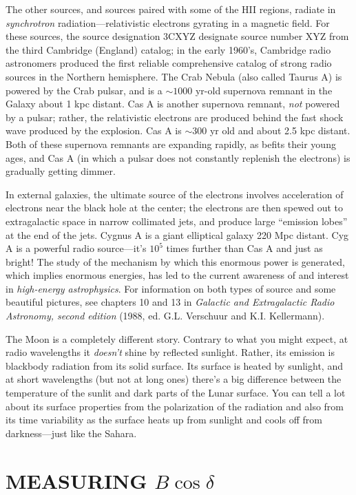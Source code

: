 \documentclass[11pt,preprint]{aastex}
\begin{document}
The other sources, and sources paired with some of the HII regions,
radiate in {\it synchrotron} radiation---relativistic electrons gyrating
in a magnetic field.  For these sources, the source designation 3CXYZ
designate source number XYZ from the third Cambridge (England) catalog;
in the early 1960's, Cambridge radio astronomers produced the first
reliable comprehensive catalog of strong radio sources in the Northern
hemisphere.  The Crab Nebula (also called Taurus A) is powered by the
Crab pulsar, and is a $\sim 1000$ yr-old supernova remnant in the Galaxy
about 1 kpc distant. Cas A is another supernova remnant, {\it not}
powered by a pulsar; rather, the relativistic electrons are produced
behind the fast shock wave produced by the explosion.  Cas A is $\sim
300$ yr old and about 2.5 kpc distant.  Both of these supernova remnants
are expanding rapidly, as befits their young ages, and Cas A (in which a
pulsar does not constantly replenish the electrons) is gradually getting
dimmer.

In external galaxies, the ultimate source of the
electrons involves acceleration of electrons near the black hole at the
center; the electrons are then spewed out to extragalactic space in
narrow collimated jets, and produce large ``emission lobes'' at the end
of the jets.  Cygnus A is a giant
elliptical galaxy 220 Mpc distant.  Cyg A is a powerful radio
source---it's $10^5$ times further than Cas A and just as bright! The
study of the mechanism by which this enormous power is generated, which
implies enormous energies, has led to the current awareness of and
interest in {\it high-energy astrophysics}.
For information on both types of source and some beautiful
pictures, see chapters 10 and 13 in {\it Galactic and Extragalactic
Radio Astronomy, second edition} (1988, ed.  G.L.  Verschuur and K.I. 
Kellermann). 

	The Moon is a completely different story. Contrary to what you
might expect, at radio wavelengths it {\it doesn't} shine by reflected
sunlight. Rather, its emission is blackbody radiation from its solid
surface. Its surface is heated by sunlight, and at short wavelengths
(but not at long ones) there's a big difference between the temperature
of the sunlit and dark parts of the Lunar surface. You can tell a lot
about its surface properties from the polarization of the radiation and
also from its time variability as the surface heats up from sunlight and
cools off from darkness---just like the Sahara.

\section {MEASURING $B \cos \delta$} \label{declinations}
\end{document}
